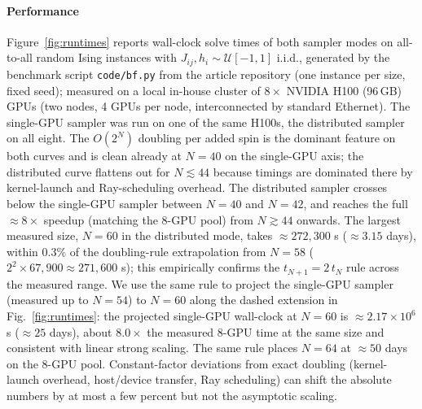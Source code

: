 \documentclass[preprint,12pt,a4paper]{elsarticle}
\begin{document}
\paragraph{Performance}
Figure~\ref{fig:runtimes} reports wall-clock solve times of both sampler
modes on all-to-all random Ising instances with $J_{ij},h_i\sim
\mathcal{U}[-1,1]$ i.i.d., generated by the benchmark script
\texttt{code/bf.py} from the article repository (one instance per size,
fixed seed); measured on a local in-house cluster of $8\times$ NVIDIA
H100 (96\,GB) GPUs (two nodes, 4 GPUs per node, interconnected by standard
Ethernet). The single-GPU sampler was run on one of the same H100s, the
distributed sampler on all eight. The $O(2^N)$ doubling per added spin
is the dominant feature on both curves and is clean already at $N=40$ on
the single-GPU axis; the distributed curve flattens out for $N \lesssim 44$
because timings are dominated there by kernel-launch and Ray-scheduling
overhead. The distributed sampler crosses below the single-GPU sampler
between $N=40$ and $N=42$, and reaches the full $\approx\!8\times$ speedup
(matching the 8-GPU pool) from $N\!\gtrsim\!44$ onwards. The largest
measured size, $N=60$ in the distributed mode, takes
$\approx\!272{,}300$ s ($\approx 3.15$ days), within $0.3\%$ of the
doubling-rule extrapolation from $N=58$ ($2^{2}\!\times\!67{,}900 \approx
271{,}600$ s); this empirically confirms the $t_{N+1}=2\,t_N$ rule across
the measured range. We use the same rule to project the single-GPU
sampler (measured up to $N=54$) to $N=60$ along the dashed extension in
Fig.~\ref{fig:runtimes}: the projected single-GPU wall-clock at $N=60$ is
$\approx\!2.17\times 10^{6}$ s ($\approx\!25$ days), about $8.0\times$
the measured 8-GPU time at the same size and consistent with linear
strong scaling. The same rule places $N=64$ at $\approx\!50$ days on the
8-GPU pool. Constant-factor deviations from exact doubling (kernel-launch
overhead, host/device transfer, Ray scheduling) can shift the absolute
numbers by at most a few percent but not the asymptotic scaling.
\end{document}
